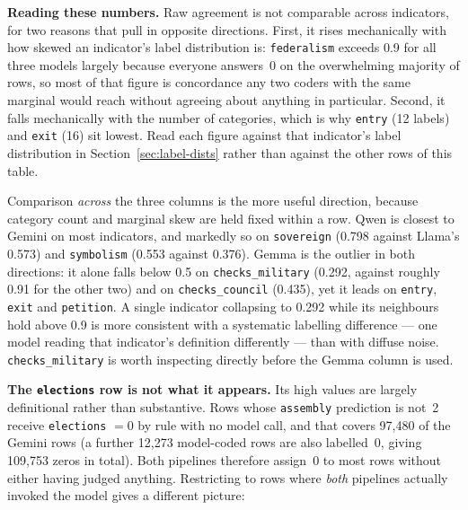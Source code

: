 \documentclass[11pt, a4paper]{article}
\begin{document}
\textbf{Reading these numbers.} Raw agreement is not comparable across indicators,
for two reasons that pull in opposite directions. First, it rises mechanically with
how skewed an indicator's label distribution is: \texttt{federalism} exceeds 0.9 for
all three models largely because everyone answers~0 on the overwhelming majority of
rows, so most of that figure is concordance any two coders with the same marginal
would reach without agreeing about anything in particular. Second, it falls
mechanically with the number of categories, which is why \texttt{entry} (12 labels)
and \texttt{exit} (16) sit lowest. Read each figure against that indicator's label
distribution in Section~\ref{sec:label-dists} rather than against the other rows of
this table.

Comparison \emph{across} the three columns is the more useful direction, because
category count and marginal skew are held fixed within a row. Qwen is closest to
Gemini on most indicators, and markedly so on \texttt{sovereign} (0.798 against
Llama's 0.573) and \texttt{symbolism} (0.553 against 0.376). Gemma is the outlier in
both directions: it alone falls below 0.5 on \texttt{checks\_\allowbreak military}
(0.292, against roughly 0.91 for the other two) and on
\texttt{checks\_\allowbreak council} (0.435), yet it leads on \texttt{entry},
\texttt{exit} and \texttt{petition}. A single indicator collapsing to 0.292 while its
neighbours hold above 0.9 is more consistent with a systematic labelling difference
--- one model reading that indicator's definition differently --- than with diffuse
noise. \texttt{checks\_\allowbreak military} is worth inspecting directly before the
Gemma column is used.

\textbf{The \texttt{elections} row is not what it appears.} Its high values are
largely definitional rather than substantive. Rows whose \texttt{assembly} prediction
is not~2 receive \texttt{elections} $=0$ by rule with no model call, and that covers
97{,}480 of the Gemini rows (a further 12{,}273 model-coded rows are also labelled~0, giving
109{,}753 zeros in total). Both pipelines therefore assign~0 to most rows without
either having judged anything. Restricting to rows where \emph{both} pipelines
actually invoked the model gives a different picture:
\end{document}
